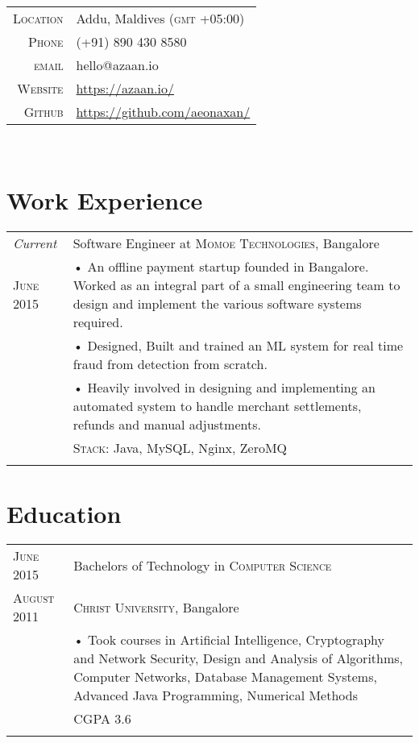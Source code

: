 \documentclass[a4paper,11pt]{article}
\begin{document}
\pagestyle{empty}

\\[25pt]
\begin{tabular}{rl}
    \textsc{Location} & Addu, Maldives (\textsc{gmt} +05:00) \\
    \textsc{Phone} & (+91) 890 430 8580 \\
    \textsc{email} & hello@azaan.io
    \\[12pt]
    \textsc{Website} & \url{https://azaan.io/} \\
    \textsc{Github} & \url{https://github.com/aeonaxan/}
\end{tabular}
\\[25pt]

\section{Work Experience}
\begin{tabular}{ p{2.5cm} | p{11cm} }
    \emph{Current} & Software Engineer at \textsc{Momoe Technologies}, Bangalore \\
    \textsc{June 2015} 
        & \footnotesize{• An offline payment startup founded in Bangalore. Worked as an integral part of a small engineering team to design and implement the various software systems required.} \\
        & \footnotesize{• Designed, Built and trained an ML system for real time fraud from detection from scratch.} \\
        & \footnotesize{• Heavily involved in designing and implementing an automated system to handle merchant settlements, refunds and manual adjustments.} \\
        & \footnotesize{\textsc{Stack: } Java, MySQL, Nginx, ZeroMQ} \\
    \multicolumn{2}{c}{} \\
\end{tabular}

%
\section{Education}
\begin{tabular}{ p{2.5cm} | p{11cm} }	
 \textsc{June} 2015 & Bachelors of Technology in \textsc{Computer Science} \\ 
 \textsc{August} 2011 & \textsc{Christ University}, Bangalore\\
 & \footnotesize{• Took courses in Artificial Intelligence, Cryptography and Network Security, Design and Analysis of Algorithms, Computer Networks, Database Management Systems, Advanced Java Programming, Numerical Methods} \\
 & \footnotesize{CGPA 3.6} \\
 \multicolumn{2}{c}{} \\
\end{tabular}
\end{document}
